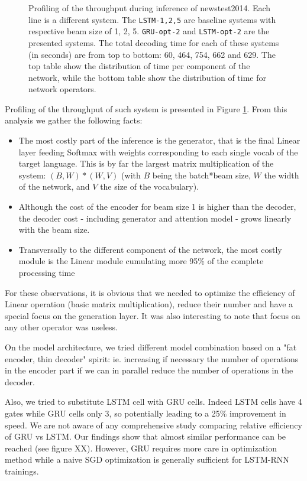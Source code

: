 \documentclass[11pt,a4paper]{article}
\begin{document}
\begin{figure}
\caption{Profiling of the throughput during inference of newstest2014. Each line is a different system. The {\tt LSTM-1,2,5} are baseline systems with respective beam size of 1, 2, 5. {\tt GRU-opt-2} and {\tt LSTM-opt-2} are the presented systems. The total decoding time for each of these systems (in seconds) are from top to bottom: 60, 464, 754, 662 and 629. The top table show the distribution of time per component of the network, while the bottom table show the distribution of time for network operators.}
\label{fig:decoding_cost}
\end{figure}

Profiling of the throughput of such system is presented in Figure \ref{fig:decoding_cost}. From this analysis we gather the following facts:

\begin{itemize}
\item The most costly part of the inference is the generator, that is the final Linear layer feeding Softmax with weights corresponding to each single vocab of the target language. This is by far the largest matrix multiplication of the system: $(B,W) * (W,V)$ (with $B$ being the batch*beam size, $W$ the width of the network, and $V$ the size of the vocabulary).
\item Although the cost of the encoder for beam size 1 is higher than the decoder, the decoder cost - including generator and attention model - grows linearly with the beam size.
\item Transversally to the different component of the network, the most costly module is the Linear module cumulating more 95\% of the complete processing time
\end{itemize}

For these observations, it is obvious that we needed to optimize the efficiency of Linear operation (basic matrix multiplication), reduce their number and have a special focus on the generation layer. It was also interesting to note that focus on any other operator was useless.

On the model architecture, we tried different model combination based on a "fat encoder, thin decoder" spirit: ie. increasing if necessary the number of operations in the encoder part if we can in parallel reduce the number of operations in the decoder.

Also, we tried to substitute LSTM cell with GRU cells. Indeed LSTM cells have 4 gates while GRU cells only 3, so potentially leading to a 25\% improvement in speed. We are not aware of any comprehensive study comparing relative efficiency of GRU vs LSTM. Our findings show that almost similar performance can be reached (see figure XX). However, GRU requires more care in optimization method while a naive SGD optimization is generally sufficient for LSTM-RNN trainings.
\end{document}
